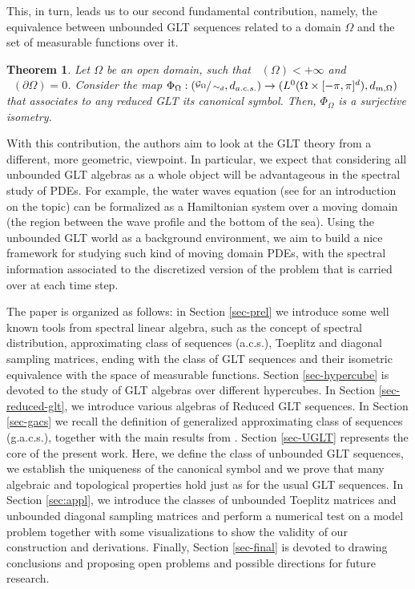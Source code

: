 \documentclass{amsart}
\newtheorem{thm}{Theorem}[section]
\DeclareMathOperator{\Ld}{\mathcal{L}^d}
\begin{document}
This, in turn, leads us to our second fundamental contribution, namely, the equivalence between unbounded GLT sequences related to a domain $\Omega$ and the set of measurable functions over it.

\begin{thm}\label{thm_isom_intro}
    Let $\Omega$ be an open domain, such that $\Ld(\Omega)<+\infty$ and $\Ld(\partial\Omega)=0$. Consider the map $\Phi_\Omega:(\sfrac{\mathcal{G}_\Omega}{\sim_d},d_{a.c.s.})\to(L^0(\Omega\times[-\pi,\pi]^d),d_{m,\Omega})$ that associates to any reduced GLT its canonical symbol. Then, $\Phi_\Omega$ is a surjective isometry.
\end{thm}


With this contribution, the authors aim to look at the GLT theory from a different, more geometric, viewpoint. In particular, we expect that considering all unbounded GLT algebras as a whole object will be advantageous in the spectral study of PDEs. For example, the water waves equation (see \cite{L13} for an introduction on the topic) can be formalized as a Hamiltonian system over a moving domain (the region between the wave profile and the bottom of the sea). Using the unbounded GLT world as a background environment, we aim to build a nice framework for studying such kind of moving domain PDEs, with the spectral information associated to the discretized version of the problem that is carried over at each time step.

The paper is organized as follows: in Section \ref{sec-prel} we introduce some well known tools from spectral linear algebra, such as the concept of spectral distribution, approximating class of sequences (a.c.s.), Toeplitz and diagonal sampling matrices, ending with the class of GLT sequences and their isometric equivalence with the space of measurable functions. Section \ref{sec-hypercube} is devoted to the study of GLT algebras over different hypercubes. In Section \ref{sec-reduced-glt}, we introduce various algebras of Reduced GLT sequences. In Section \ref{sec-gacs} we recall the definition of generalized approximating class of sequences (g.a.c.s.), together with the main results from \cite{gacs}. Section \ref{sec-UGLT} represents the core of the present work. Here, we define the class of unbounded GLT sequences, we establish the uniqueness of the canonical symbol and we prove that many algebraic and topological properties hold just as for the usual GLT sequences. In Section \ref{sec:appl}, we introduce the classes of unbounded Toeplitz matrices and unbounded diagonal sampling matrices and perform a numerical test on a model problem together with some visualizations to show the validity of our construction and derivations. Finally, Section \ref{sec-final} is devoted to drawing conclusions and proposing open problems and possible directions for future research.
 
\end{document}
